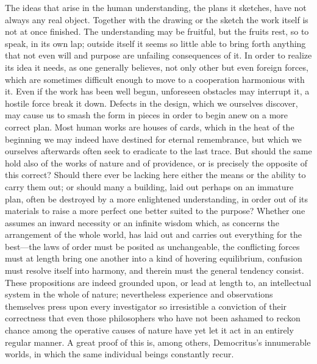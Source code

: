 \documentclass[12pt,a4paper]{article}
\begin{document}
The ideas that arise in the human understanding, the plans it sketches, have not
always any real object. Together with the drawing or the sketch the work itself
is not at once finished. The understanding may be fruitful, but the fruits rest,
so to speak, in its own lap; outside itself it seems so little able to bring
forth anything that not even will and purpose are unfailing consequences of it.
In order to realize its idea it needs, as one generally believes, not only other
but even foreign forces, which are sometimes difficult enough to move to a
cooperation harmonious with it. Even if the work has been well begun, unforeseen
obstacles may interrupt it, a hostile force break it down. Defects in the design,
which we ourselves
discover, may cause us to smash the form in pieces in order to begin anew on a
more correct plan. Most human works are houses of cards, which in the heat of the
beginning we may indeed have destined for eternal remembrance, but which we
ourselves afterwards often seek to eradicate to the last trace. But should the
same hold also of the works of nature and of providence, or is precisely the
opposite of this correct? Should there ever be lacking here either the means or
the ability to carry them out; or should many a building, laid out perhaps on an
immature plan, often be destroyed by a more enlightened understanding, in order
out of its materials to raise a more perfect one better suited to the purpose?
Whether one assumes an inward necessity or an infinite wisdom which, as concerns
the arrangement of the whole world, has laid out and carries out everything for
the best---the laws of order must be posited as unchangeable, the conflicting
forces must at length bring one another into a kind of hovering equilibrium,
confusion must resolve itself into harmony, and therein must the general tendency
consist. These propositions are indeed grounded upon, or lead at length to, an
intellectual system in the whole of nature; nevertheless experience and
observations themselves press upon every investigator so irresistible a conviction
of their correctness that even those philosophers who have not been ashamed to
reckon chance among the operative causes of nature have yet let it act in an
entirely regular manner. A great proof of this is, among others, Democritus's
innumerable worlds, in which the same individual beings constantly recur.
\end{document}
